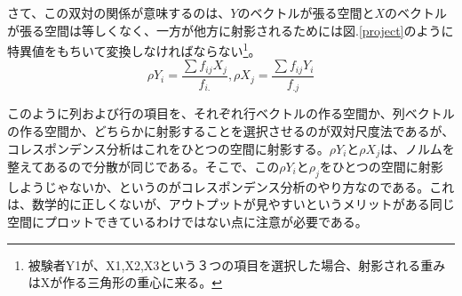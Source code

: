 \documentclass{ltjsbook}
\begin{document}
さて、この双対の関係が意味するのは、$Y$のベクトルが張る空間と$X$のベクトルが張る空間は等しくなく、一方が他方に射影されるためには図.\ref{project}のように特異値をもちいて変換しなければならない\footnote{被験者Y1が、X1,X2,X3という３つの項目を選択した場合、射影される重みはXが作る三角形の重心に来る。}。
\begin{equation}
    \rho Y_{i} = \displaystyle{\frac{\sum f_{ij}X_{j}}{f_{i.}}},
    \rho X_{j} = \displaystyle{\frac{\sum f_{ij}Y_{i}}{f_{.j}}}
    \label{project}
\end{equation}


このように列および行の項目を、それぞれ行ベクトルの作る空間か、列ベクトルの作る空間か、どちらかに射影することを選択させるのが双対尺度法であるが、コレスポンデンス分析はこれをひとつの空間に射影する。$\rho Y_{i}$と$\rho X_{j}$は、ノルムを整えてあるので分散が同じである。そこで、この$\rho Y_{i}$と$\rho _{j}$をひとつの空間に射影しようじゃないか、というのがコレスポンデンス分析のやり方なのである。これは、数学的に正しくないが、アウトプットが見やすいというメリットがある同じ空間にプロットできているわけではない点に注意が必要である。
\end{document}
